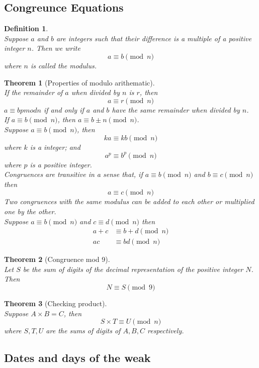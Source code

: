\documentclass[12pt]{article}
\newtheorem{definition}{Definition}[section]
\newtheorem{theorem}{Theorem}[section]
\theoremstyle{definition}
\begin{document}
\subsection{Congreunce Equations}
\begin{definition}
\hfill\\\normalfont Suppose $a$ and $b$ are integers such that their difference is a multiple of a positive integer $n$. Then we write
\[
a\equiv b \pmod n
\]
where $n$ is called the modulus.
\end{definition}
\begin{theorem}[Properties of modulo arithematic]
\hfill\\\normalfont If the remainder of $a$ when divided by $n$ is $r$, then
\[
a\equiv r \pmod n
\]
$a\equiv b pmod n$ if and only if $a$ and $b$ have the same remainder when divided by $n$.\\
If $a\equiv b\pmod n$, then $a\equiv b\pm n\pmod n$.\\
Suppose $a\equiv b\pmod n$, then
\[
ka \equiv kb \pmod n
\]
where $k$ is a integer; and
\[
a^p\equiv b^p\pmod n
\]
where $p$ is a positive integer.\\
Congruences are transitive in a sense that, if $a\equiv b\pmod n$ and $b\equiv c\pmod n$ then
\[
a\equiv c\pmod n
\]
Two congruences with the same modulus can be added to each other or multiplied one by the other.\\Suppose $a\equiv b\pmod n$ and $c\equiv d\pmod n$ then
\begin{align*}
a+c&\equiv b+d\pmod n\\
ac&\equiv bd\pmod n
\end{align*}
\end{theorem}
\begin{theorem}[Congruence mod 9]
\hfill\\\normalfont Let $S$ be the sum of digits of the decimal representation of the positive integer $N$. Then
\[
N\equiv S\pmod 9
\]
\end{theorem}
\begin{theorem}[Checking product]
\hfill\\\normalfont Suppose $A\times B = C$, then
\[
S\times T\equiv U\pmod n
\]
where $S,T,U$ are the sums of digits of $A,B,C$ respectively.
\subsection{Dates and days of the weak}
\end{theorem}
\end{document}
